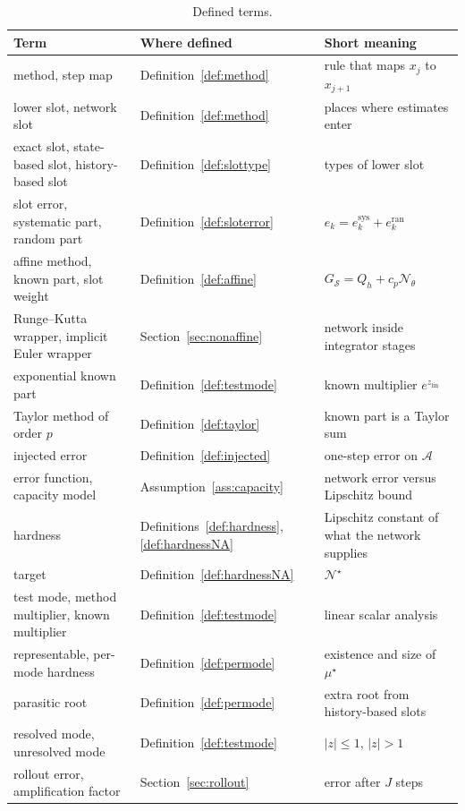 \documentclass[11pt]{article}
\theoremstyle{definition}
\theoremstyle{remark}
\newcommand{\Aset}{\mathcal{A}}          %
\newcommand{\Net}{\mathcal{N}_\theta}    %
\newcommand{\Netstar}{\mathcal{N}^\star} %
\newcommand{\Meth}{\mathcal{S}}          %
\newcommand{\sys}{\mathrm{sys}}
\newcommand{\ran}{\mathrm{ran}}
\begin{document}
\begin{table}[htbp]
\centering
\caption{Defined terms.}\label{tab:terms}
\small
\begin{tabular}{@{}p{}p{}p{}@{}}
\toprule
Term & Where defined & Short meaning \\
\midrule
method, step map & Definition~\ref{def:method} & rule that maps $x_j$ to $x_{j+1}$ \\
lower slot, network slot & Definition~\ref{def:method} & places where estimates enter \\
exact slot, state-based slot, history-based slot & Definition~\ref{def:slottype} & types of lower slot \\
slot error, systematic part, random part & Definition~\ref{def:sloterror} & $e_k = e_k^\sys + e_k^\ran$ \\
affine method, known part, slot weight & Definition~\ref{def:affine} & $G_\Meth = Q_h + c_p\Net$ \\
Runge--Kutta wrapper, implicit Euler wrapper & Section~\ref{sec:nonaffine} & network inside integrator stages \\
exponential known part & Definition~\ref{def:testmode} & known multiplier $e^{z_{\mathrm{lin}}}$ \\
Taylor method of order $p$ & Definition~\ref{def:taylor} & known part is a Taylor sum \\
injected error & Definition~\ref{def:injected} & one-step error on $\Aset$ \\
error function, capacity model & Assumption~\ref{ass:capacity} & network error versus Lipschitz bound \\
hardness & Definitions~\ref{def:hardness}, \ref{def:hardnessNA} & Lipschitz constant of what the network supplies \\
target & Definition~\ref{def:hardnessNA} & $\Netstar$ \\
test mode, method multiplier, known multiplier & Definition~\ref{def:testmode} & linear scalar analysis \\
representable, per-mode hardness & Definition~\ref{def:permode} & existence and size of $\mu^\star$ \\
parasitic root & Definition~\ref{def:permode} & extra root from history-based slots \\
resolved mode, unresolved mode & Definition~\ref{def:testmode} & $|z|\le 1$, $|z|>1$ \\
rollout error, amplification factor & Section~\ref{sec:rollout} & error after $J$ steps \\
\bottomrule
\end{tabular}
\end{table}
\end{document}
